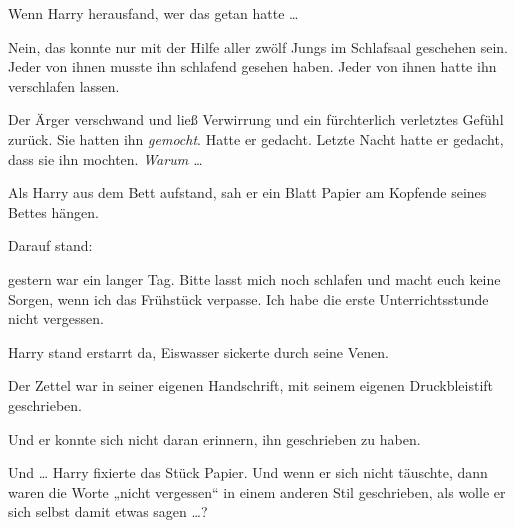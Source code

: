 Wenn Harry herausfand, wer das getan hatte …

Nein, das konnte nur mit der Hilfe aller zwölf Jungs im Schlafsaal geschehen sein. Jeder von ihnen musste ihn schlafend gesehen haben. Jeder von ihnen hatte ihn verschlafen lassen.

Der Ärger verschwand und ließ Verwirrung und ein fürchterlich verletztes Gefühl zurück. Sie hatten ihn \emph{gemocht}. Hatte er gedacht. Letzte Nacht hatte er gedacht, dass sie ihn mochten. \emph{Warum …}

Als Harry aus dem Bett aufstand, sah er ein Blatt Papier am Kopfende seines Bettes hängen.

Darauf stand:

\begin{writtenNote}

gestern war ein langer Tag. Bitte lasst mich noch schlafen und macht euch keine Sorgen, wenn ich das Frühstück verpasse. Ich habe die erste Unterrichtsstunde nicht vergessen.

\end{writtenNote}

Harry stand erstarrt da, Eiswasser sickerte durch seine Venen.

Der Zettel war in seiner eigenen Handschrift, mit seinem eigenen Druckbleistift geschrieben.

Und er konnte sich nicht daran erinnern, ihn geschrieben zu haben.

Und … Harry fixierte das Stück Papier. Und wenn er sich nicht täuschte, dann waren die Worte „nicht vergessen“ in einem anderen Stil geschrieben, als wolle er sich selbst damit etwas sagen …?

